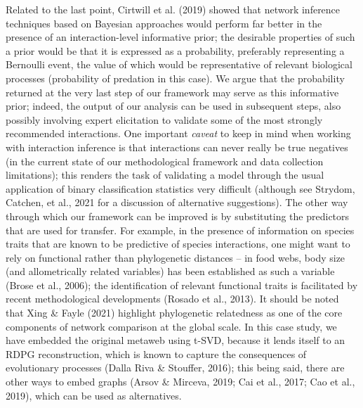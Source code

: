 \documentclass[10pt,oneside]{article}
\begin{document}
Related to the last point, Cirtwill et al. (2019) showed that network
inference techniques based on Bayesian approaches would perform far
better in the presence of an interaction-level informative prior; the
desirable properties of such a prior would be that it is expressed as a
probability, preferably representing a Bernoulli event, the value of
which would be representative of relevant biological processes
(probability of predation in this case). We argue that the probability
returned at the very last step of our framework may serve as this
informative prior; indeed, the output of our analysis can be used in
subsequent steps, also possibly involving expert elicitation to validate
some of the most strongly recommended interactions. One important
\emph{caveat} to keep in mind when working with interaction inference is
that interactions can never really be true negatives (in the current
state of our methodological framework and data collection limitations);
this renders the task of validating a model through the usual
application of binary classification statistics very difficult (although
see Strydom, Catchen, et al., 2021 for a discussion of alternative
suggestions). The other way through which our framework can be improved
is by substituting the predictors that are used for transfer. For
example, in the presence of information on species traits that are known
to be predictive of species interactions, one might want to rely on
functional rather than phylogenetic distances -- in food webs, body size
(and allometrically related variables) has been established as such a
variable (Brose et al., 2006); the identification of relevant functional
traits is facilitated by recent methodological developments (Rosado et
al., 2013). It should be noted that Xing \& Fayle (2021) highlight
phylogenetic relatedness as one of the core components of network
comparison at the global scale. In this case study, we have embedded the
original metaweb using t-SVD, because it lends itself to an RDPG
reconstruction, which is known to capture the consequences of
evolutionary processes (Dalla Riva \& Stouffer, 2016); this being said,
there are other ways to embed graphs (Arsov \& Mirceva, 2019; Cai et
al., 2017; Cao et al., 2019), which can be used as alternatives.
\end{document}
